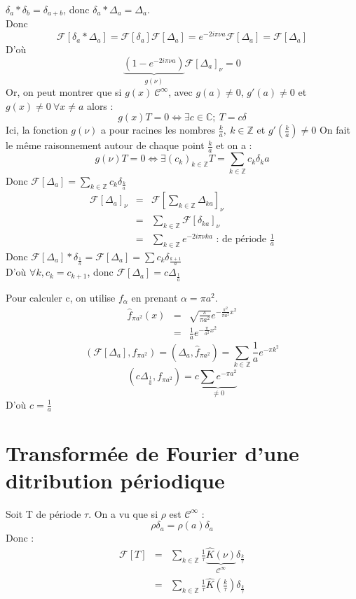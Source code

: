 \documentclass{article}
\begin{document}
\begin{dem}
	$\delta_a * \delta_b = \delta_{a+b}$, donc $\delta_a * \Delta_a=\Delta_a$.\\
	Donc \[\mathcal{F}[\delta_a * \Delta_a]=\mathcal{F}[\delta_a]\mathcal{F}[\Delta_a]=e^{-2i\pi\nu a}\mathcal{F}[\Delta_a]=\mathcal{F}[\Delta_a]\]
	D'où \[\underbrace{(1-e^{-2i\pi\nu a})}_{g(\nu)}\mathcal{F}[\Delta_a]_{\nu}=0\]
	Or, on peut montrer que si $g(x)\ \mathcal{C}^{\infty}$, avec $g(a)\neq0$, $g'(a)\neq0$ et $g(x)\neq0\ \forall x\neq a$ alors : 
	\[g(x)T=0 \Leftrightarrow \exists c\in\mathbb{C};\ T=c\delta\]
	Ici, la fonction $g(\nu)$ a pour racines les nombres $\frac{k}{a},\ k\in\mathbb{Z}$ et $g'\left(\frac{k}{a}\right)\neq 0$
	On fait le même raisonnement autour de chaque point $\frac{k}{a}$ et on a : 
	\[g(\nu)T=0 \Leftrightarrow \exists(c_k)_{k\in\mathbb{Z}} T=\sum_{k\in\mathbb{Z}} c_k\delta_{k}{a}\]
	Donc $\mathcal{F}[\Delta_a]=\sum_{k\in\mathbb{Z}} c_k \delta_{\frac{k}{a}}$
	\begin{eqnarray*}
		\mathcal{F}[\Delta_a]_{\nu}&=&\mathcal{F}[\sum_{k\in\mathbb{Z}} \Delta_{ka}]_{\nu}\\
				&=& \sum_{k\in\mathbb{Z}}\mathcal{F}[\delta_{ka}]_{\nu}\\
		    &=& \sum_{k\in\mathbb{Z}} e^{-2i\pi\nu ka} \text{ : de période } \frac{1}{a}
	\end{eqnarray*}
	Donc $\mathcal{F}[\Delta_a]*\delta_{\frac{1}{a}}=\mathcal{F}[\Delta_a]=\sum c_k \delta_{\frac{k+1}{a}}$\\
	D'où $\forall k, c_k=c_{k+1}$, donc $\mathcal{F}[\Delta_a]=c\Delta_{\frac{1}{a}}$
	
	Pour calculer c, on utilise $f_{\alpha}$ en prenant $\alpha=\pi a^2$.
	\begin{eqnarray*}
		\hat{f}_{\pi a^2}(x)&=&\sqrt{\frac{\pi}{\pi a^2}} e^{-\frac{\pi^2}{\pi a^2} x^2} \\ &=& \frac{1}{a} e^{-\frac{\pi}{a^2}x^2}
	\end{eqnarray*}
	\[(\mathcal{F}[\Delta_a],f_{\pi a^2})=(\Delta_a,\hat{f}_{\pi a^2})=\sum_{k\in\mathbb{Z}} \frac{1}{a} e^{-\pi k^2}\]
	\[(c\Delta_{\frac{1}{a}},f_{\pi a^2})=c\underbrace{\sum e^{-\pi a^2}}_{\neq 0}\]
		D'où $c=\frac{1}{a}$
\end{dem}

\section{Transformée de Fourier d'une ditribution périodique}
Soit T de période $\tau$. On a vu que si $\rho$ est $\mathcal{C}^{\infty}$ : \[\rho \delta_a = \rho(a) \delta_a\]
Donc : 
\begin{eqnarray*}
	\mathcal{F}[T]&=&\sum_{k\in\mathbb{Z}} \frac{1}{\tau} \underbrace{\hat{K}(\nu)}_{\mathcal{C}^{\infty}} \delta_{\frac{k}{\tau}}\\
			     &=&\sum_{k\in\mathbb{Z}} \frac{1}{\tau} \hat{K} \left( \frac{k}{\tau} \right) \delta_{\frac{k}{\tau}}
\end{eqnarray*}
\end{document}
